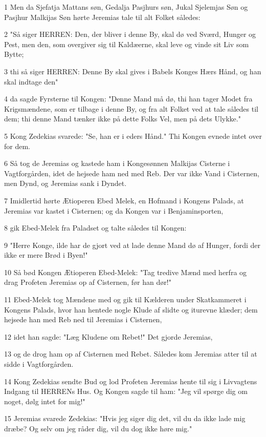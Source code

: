 \par 1 Men da Sjefatja Mattans søn, Gedalja Pasjhurs søn, Jukal Sjelemjas Søn og Pasjhur Malkijas Søn hørte Jeremias tale til alt Folket således:
\par 2 "Så siger HERREN: Den, der bliver i denne By, skal dø ved Sværd, Hunger og Pest, men den, som overgiver sig til Kaldæerne, skal leve og vinde sit Liv som Bytte;
\par 3 thi så siger HERREN: Denne By skal gives i Babels Konges Hærs Hånd, og han skal indtage den"
\par 4 da sagde Fyrsterne til Kongen: "Denne Mand må dø, thi han tager Modet fra Krigsmændene, som er tilbage i denne By, og fra alt Folket ved at tale således til dem; thi denne Mand tænker ikke på dette Folks Vel, men på dets Ulykke."
\par 5 Kong Zedekias svarede: "Se, han er i eders Hånd." Thi Kongen evnede intet over for dem.
\par 6 Så tog de Jeremias og kastede ham i Kongesønnen Malkijas Cisterne i Vagtforgården, idet de hejsede ham ned med Reb. Der var ikke Vand i Cisternen, men Dynd, og Jeremias sank i Dyndet.
\par 7 Imidlertid hørte Ætioperen Ebed Melek, en Hofmand i Kongens Palads, at Jeremias var kastet i Cisternen; og da Kongen var i Benjaminsporten,
\par 8 gik Ebed-Melek fra Paladset og talte således til Kongen:
\par 9 "Herre Konge, ilde har de gjort ved at lade denne Mand dø af Hunger, fordi der ikke er mere Brød i Byen!"
\par 10 Så bød Kongen Ætioperen Ebed-Melek: "Tag tredive Mænd med herfra og drag Profeten Jeremias op af Cisternen, før han dør!"
\par 11 Ebed-Melek tog Mændene med og gik til Kælderen under Skatkammeret i Kongens Palads, hvor han hentede nogle Klude af slidte og iturevne klæder; dem hejsede han med Reb ned til Jeremias i Cisternen,
\par 12 idet han sagde: "Læg Kludene om Rebet!" Det gjorde Jeremias,
\par 13 og de drog ham op af Cisternen med Rebet. Således kom Jeremias atter til at sidde i Vagtforgården.
\par 14 Kong Zedekias sendte Bud og lod Profeten Jeremias hente til sig i Livvagtens Indgang til HERRENs Hus. Og Kongen sagde til ham: "Jeg vil spørge dig om noget, dølg intet for mig!"
\par 15 Jeremias svarede Zedekias: "Hvis jeg siger dig det, vil du da ikke lade mig dræbe? Og selv om jeg råder dig, vil du dog ikke høre mig."
